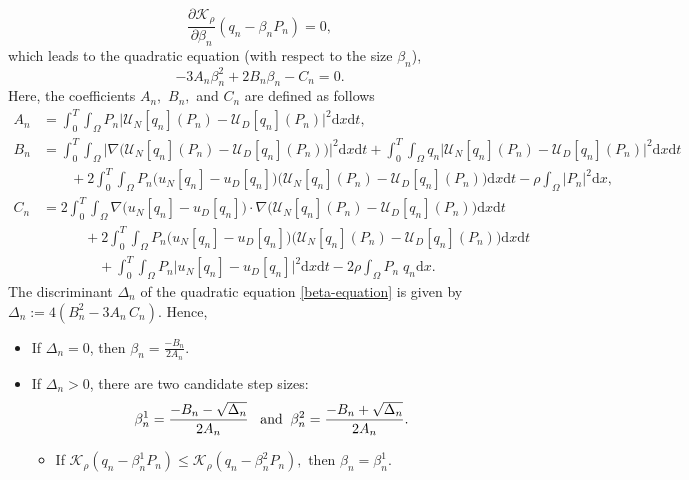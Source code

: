 \documentclass[a4paper,12pt,reqno,natbib]{amsart}
\newcommand{\dx} {\displaystyle\mathrm{d}x}
\newcommand{\dt} {\displaystyle\mathrm{d}t}
\def\ds{\displaystyle}
\begin{document}
{\begin{equation*}
    \frac{\partial \mathcal{K}_\rho }{\partial \beta_n}(q_n - \beta_n P_n)=0,
\end{equation*}
which leads to the quadratic equation (with respect to the size $\beta_n$),
\begin{equation}\label{beta-equation}
   -3A_n \beta_n^2 + 2B_n \beta_n -C_n =0. 
\end{equation}
Here, the coefficients $A_n,$ $B_n,$ and $C_n$ are defined as follows
\begin{align*}
A_n&= \int_0^T\int_\Omega P_{n} \Big| \mathcal{U}_{N}[q_n](P_n)-\mathcal{U}_{D}[q_n](P_n)\Big|^2 \dx\dt, \\
B_n&= \int_0^T\int_\Omega \Big|\nabla\Big( \mathcal{U}_{N}[q_n](P_n)-\mathcal{U}_{D}[q_n](P_n)\Big)\Big|^2 \dx\dt + \int_0^T\int_\Omega q_{n} \Big| \mathcal{U}_{N}[q_n](P_n)-\mathcal{U}_{D}[q_n](P_n)\Big|^2 \dx\dt\\
&\qquad+2  \int_0^T\int_\Omega P_{n} \Big(u_N[q_n]-u_D[q_n] \Big)\Big( \mathcal{U}_{N}[q_n](P_n)-\mathcal{U}_{D}[q_n](P_n)\Big) \dx\dt -\rho\int_{\Omega}|P_n|^2\dx,   \\
C_n&=  2\int_0^T\int_\Omega\nabla \Big(u_N[q_n]-u_D[q_n] \Big)\cdot\nabla \big( \mathcal{U}_{N}[q_n](P_n)-\mathcal{U}_{D}[q_n](P_n)\Big) \dx\dt\\
&\qquad\quad+2\int_0^T\int_\Omega P_{n} \Big(u_N[q_n]-u_D[q_n] \Big)\Big( \mathcal{U}_{N}[q_n](P_n)-\mathcal{U}_{D}[q_n](P_n)\Big) \dx\dt  \\&\qquad\qquad+\ds \int_0^T\int_\Omega P_{n} \Big|u_N[q_n]-u_D[q_n] \Big|^2\dx\dt -2\rho\int_{\Omega}P_n\;q_n\dx.
\end{align*}
The discriminant $\Delta_n $ of the quadratic equation \eqref{beta-equation} is given by
$
\Delta_n := 4(B_n^2 -3A_n\,C_n).
$
Hence,
\begin{itemize}
\item If $\Delta_n=0$, then 
$
\beta_{n}=\frac{-B_n}{2A_n}.
$

\item If $\Delta_n>0$, there are two candidate step sizes:
\begin{equation*}
 \beta_n^1=\frac{-B_n-\sqrt{\Delta_n}}{2A_n}\;\;\;\hbox{and}\;\;\beta_n^2=   \frac{-B_n+\sqrt{\Delta_n}}{2A_n}.
\end{equation*}
\begin{itemize}
\item[-] If $ \mathcal{K}_{\rho}(q_n - \beta_n^1 P_n)\leq  \mathcal{K}_{\rho}(q_n - \beta_n^2 P_n),$ then
$
\beta_{n}=\beta_n^1. 
$


\end{itemize}
\end{itemize}}
\end{document}

